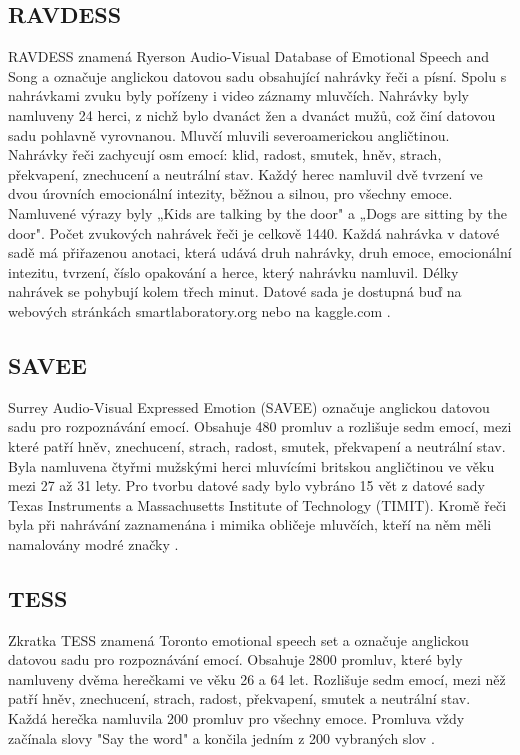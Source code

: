 \documentclass[FM,BP]{tulthesis}
\begin{document}
\subsection{RAVDESS} %
RAVDESS \cite{Livingstone2018} znamená Ryerson Audio-Visual Database of Emotional Speech and Song a označuje anglickou datovou sadu obsahující nahrávky řeči a písní. Spolu s nahrávkami zvuku byly pořízeny i video záznamy mluvčích. Nahrávky byly namluveny 24 herci, z nichž bylo dvanáct žen a dvanáct mužů, což činí datovou sadu pohlavně vyrovnanou. Mluvčí mluvili severoamerickou angličtinou. Nahrávky řeči zachycují osm emocí: klid, radost, smutek, hněv, strach, překvapení, znechucení a neutrální stav. Každý herec namluvil dvě tvrzení ve dvou úrovních emocionální intezity, běžnou a silnou, pro všechny emoce. Namluvené výrazy byly „Kids are talking by the door" a „Dogs are sitting by the door". Počet zvukových nahrávek řeči je celkově 1440. Každá nahrávka v datové sadě má přiřazenou anotaci, která udává druh nahrávky, druh emoce, emocionální intezitu, tvrzení, číslo opakování a herce, který nahrávku namluvil. Délky nahrávek se pohybují kolem třech minut. Datové sada je dostupná buď na webových stránkách smartlaboratory.org nebo na kaggle.com \cite{smart_lab}.

\subsection{SAVEE} %
Surrey Audio-Visual Expressed Emotion (SAVEE) označuje anglickou datovou sadu pro rozpoznávání emocí. Obsahuje 480 promluv a rozlišuje sedm emocí, mezi které patří hněv, znechucení, strach, radost, smutek, překvapení a neutrální stav. Byla namluvena čtyřmi mužskými herci mluvícími britskou angličtinou ve věku mezi 27 až 31 lety. Pro tvorbu datové sady bylo vybráno 15 vět z datové sady Texas Instruments a Massachusetts Institute of Technology (TIMIT). Kromě řeči byla při nahrávání zaznamenána i mimika obličeje mluvčích, kteří na něm měli namalovány modré značky \cite{savee}.

\subsection{TESS} %
Zkratka TESS \cite{SP2/E8H2MF_2020} znamená Toronto emotional speech set a označuje anglickou datovou sadu pro rozpoznávání emocí. Obsahuje 2800 promluv, které byly namluveny dvěma herečkami ve věku 26 a 64 let. Rozlišuje sedm emocí, mezi něž patří hněv, znechucení, strach, radost, překvapení, smutek a neutrální stav. Každá herečka namluvila 200 promluv pro všechny emoce. Promluva vždy začínala slovy "Say the word" a končila jedním z 200 vybraných slov \cite{tess}.
\end{document}
